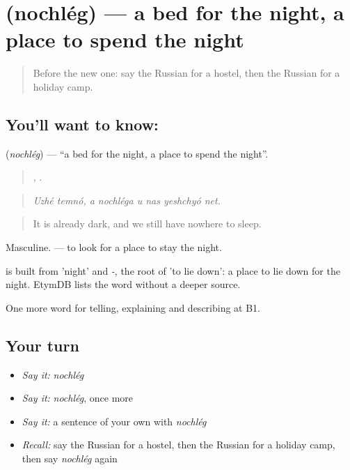 \section[\texorpdfstring{\ru{ночлег} (nochlég)}{ночлег (nochlég)}]{ (nochlég) — a bed for the night, a place to spend the night}

\label{lesson:RU-C428-nochleg}



\begin{quote}
Before the new one: say the Russian for a hostel, then the Russian for a holiday camp.
\end{quote}

\subsection*{You'll want to know: }
\textbf{} (\emph{nochlég}) — \textquotedblleft{}a bed for the night, a place to spend the night\textquotedblright{}.

\begin{quote}
 ,      .
\end{quote}

\begin{quote}
\emph{Uzhé temnó, a nochléga u nas yeshchyó net.}
\end{quote}

\begin{quote}
It is already dark, and we still have nowhere to sleep.
\end{quote}

Masculine. \emph{ } — to look for a place to stay the night.

\begin{cousinweb}
\emph{} is built from \emph{} 'night' and \emph{-}, the root of \emph{} 'to lie down': a place to lie down for the night. EtymDB lists the word without a deeper source.
\end{cousinweb}

\begin{grammarlens}[title={What you've built}]
One more word for telling, explaining and describing at B1.
\end{grammarlens}

\subsection*{Your turn}
\begin{itemize}
\raggedright
  \item \emph{Say it:} \emph{nochlég}
  \item \emph{Say it:} \emph{nochlég}, once more
  \item \emph{Say it:} a sentence of your own with \emph{nochlég}
  \item \emph{Recall:} say the Russian for a hostel, then the Russian for a holiday camp, then say \emph{nochlég} again
\end{itemize}

